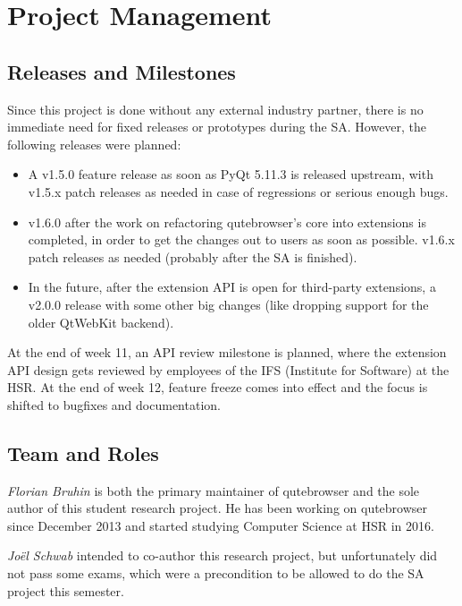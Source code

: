 
\chapter{Project Management}
\label{ch:projectman}

\section{Releases and Milestones}
\label{sec:releases}

Since this project is done without any external industry partner, there is no
immediate need for fixed releases or prototypes during the SA. However, the
following releases were planned:

\begin{itemize}
  \item A v1.5.0 feature release as soon as PyQt 5.11.3 is released upstream,
    with v1.5.x patch releases as needed in case of regressions or serious
    enough bugs.
  \item v1.6.0 after the work on refactoring qutebrowser's core into extensions
    is completed, in order to get the changes out to users as soon as possible.
    v1.6.x patch releases as needed (probably after the SA is finished).
  \item In the future, after the extension API is open for third-party
    extensions, a v2.0.0 release with some other big changes (like dropping support
    for the older QtWebKit backend).
\end{itemize}

At the end of week 11, an API review milestone is planned, where the extension
API design gets reviewed by employees of the IFS (Institute for Software) at the
HSR. At the end of week 12, feature freeze comes into effect and the focus is
shifted to bugfixes and documentation.

\section{Team and Roles}
\label{sec:team}
\emph{Florian Bruhin} is both the primary maintainer of qutebrowser and the
sole author of this student research project. He has been working on qutebrowser since
December 2013 and started studying Computer Science at HSR in 2016.

\emph{Joël Schwab} intended to co-author this research project, but
unfortunately did not pass some exams, which were a precondition to be allowed to
do the SA project this semester.

